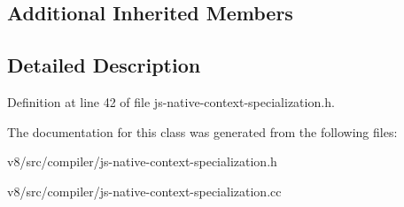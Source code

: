 \subsection*{Additional Inherited Members}


\subsection{Detailed Description}


Definition at line 42 of file js-\/native-\/context-\/specialization.\+h.



The documentation for this class was generated from the following files\+:\begin{DoxyCompactItemize}
\item 
v8/src/compiler/js-\/native-\/context-\/specialization.\+h\item 
v8/src/compiler/js-\/native-\/context-\/specialization.\+cc\end{DoxyCompactItemize}
